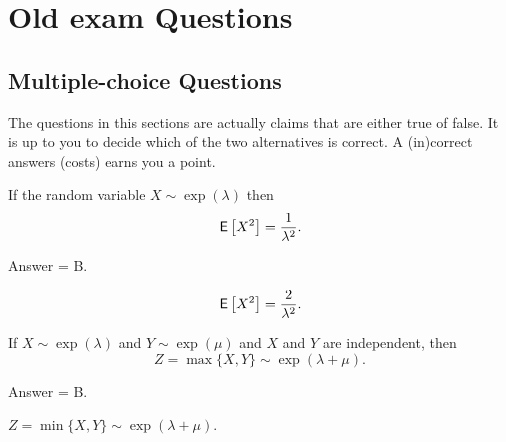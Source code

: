 \section{Old exam Questions}

\subsection{Multiple-choice Questions}

The questions in this sections are actually claims that are either true of false.
It is up to you to decide which of the two alternatives is correct.
A (in)correct answers (costs) earns you a point.

\begin{exercise}[201703] 
 If the random variable $X\sim\exp(\lambda)$ then
 \begin{equation*}
 \,\mathsf{E}\left[X^2\right]= \frac{1}{\lambda^2}.
 \end{equation*}
\begin{solution}
 Answer = B.

 \begin{equation*}
 \,\mathsf{E}\left[X^2\right]= \frac{2}{\lambda^2}.
 \end{equation*}

\end{solution}
\end{exercise}

\begin{exercise}[201703]
 If $X\sim\exp(\lambda)$ and $Y\sim\exp(\mu)$ and $X$ and $Y$ are
 independent, then
 \begin{equation*}
Z=\max\{X,Y\}\sim\exp(\lambda+\mu).
 \end{equation*}
\begin{solution}
 Answer = B.

$Z=\min\{X,Y\} \sim \exp(\lambda+\mu)$.

\end{solution}
\end{exercise}

